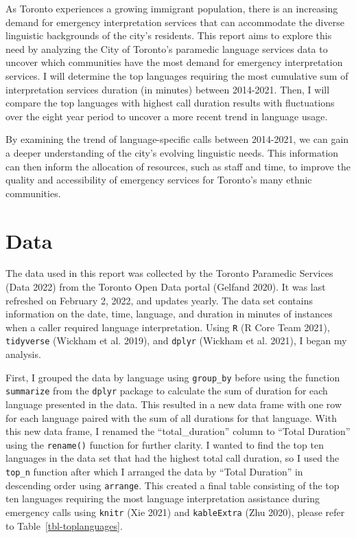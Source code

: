 \documentclass[
  letterpaper,
  DIV=11,
  numbers=noendperiod]{scrartcl}
\begin{document}
As Toronto experiences a growing immigrant population, there is an
increasing demand for emergency interpretation services that can
accommodate the diverse linguistic backgrounds of the city's residents.
This report aims to explore this need by analyzing the City of Toronto's
paramedic language services data to uncover which communities have the
most demand for emergency interpretation services. I will determine the
top languages requiring the most cumulative sum of interpretation
services duration (in minutes) between 2014-2021. Then, I will compare
the top languages with highest call duration results with fluctuations
over the eight year period to uncover a more recent trend in language
usage.

By examining the trend of language-specific calls between 2014-2021, we
can gain a deeper understanding of the city's evolving linguistic needs.
This information can then inform the allocation of resources, such as
staff and time, to improve the quality and accessibility of emergency
services for Toronto's many ethnic communities.

\hypertarget{data}{%
\section{Data}\label{data}}

The data used in this report was collected by the Toronto Paramedic
Services (Data 2022) from the Toronto Open Data portal (Gelfand 2020).
It was last refreshed on February 2, 2022, and updates yearly. The data
set contains information on the date, time, language, and duration in
minutes of instances when a caller required language interpretation.
Using \texttt{R} (R Core Team 2021), \texttt{tidyverse} (Wickham et al.
2019), and \texttt{dplyr} (Wickham et al. 2021), I began my analysis.

First, I grouped the data by language using \texttt{group\_by} before
using the function \texttt{summarize} from the \texttt{dplyr} package to
calculate the sum of duration for each language presented in the data.
This resulted in a new data frame with one row for each language paired
with the sum of all durations for that language. With this new data
frame, I renamed the ``total\_duration'' column to ``Total Duration''
using the \texttt{rename()} function for further clarity. I wanted to
find the top ten languages in the data set that had the highest total
call duration, so I used the \texttt{top\_n} function after which I
arranged the data by ``Total Duration'' in descending order using
\texttt{arrange}. This created a final table consisting of the top ten
languages requiring the most language interpretation assistance during
emergency calls using \texttt{knitr} (Xie 2021) and \texttt{kableExtra}
(Zhu 2020), please refer to Table~\ref{tbl-toplanguages}.
\end{document}
